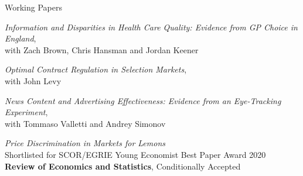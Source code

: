 \documentclass{resume}
\begin{document}
\begin{rSection}{Working Papers}

\emph{Information and Disparities in Health Care Quality: Evidence from GP Choice in England}, 
\\with Zach Brown, Chris Hansman and Jordan Keener

\emph{Optimal Contract Regulation in Selection Markets}, 
\\with John Levy

\emph{News Content and Advertising Effectiveness: Evidence from an Eye-Tracking Experiment}, 
\\with Tommaso Valletti and Andrey Simonov

\emph{Price Discrimination in Markets for Lemons}
\\ Shortlisted for SCOR/EGRIE Young Economist Best Paper Award 2020
\\ \textbf{Review of Economics and Statistics}, Conditionally Accepted


\end{rSection}
\end{document}
